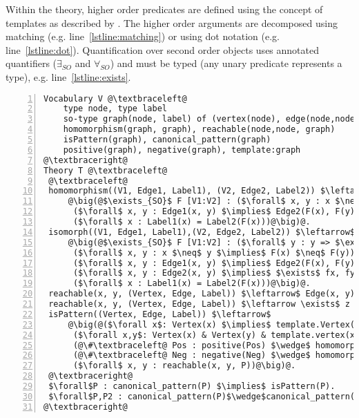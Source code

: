 Within the theory, higher order predicates are defined using the concept of templates as described by \cite{DBLP:journals/tplp/DassevilleHJD15}. %
The higher order arguments are decomposed using matching (e.g. line~\ref{lstline:matching}) or using dot notation (e.g. line~\ref{lstline:dot}).
Quantification over second order objects uses annotated quantifiers ($\exists_{SO}$ and $\forall_{SO}$) and must be typed (any unary predicate represents a type), e.g. line~\ref{lstline:exists}.

\begin{lstlisting}[mathescape,style=model,caption={Faithful encoding for the general graph mining problem},label=lst:faithful, numbers=left]
Vocabulary V @\textbraceleft@
    type node, type label
    so-type graph(node, label) of (vertex(node), edge(node,node), label(node):label)
    homomorphism(graph, graph), reachable(node,node, graph)
    isPattern(graph), canonical_pattern(graph)
    positive(graph), negative(graph), template:graph 
@\textbraceright@ 
Theory T @\textbraceleft@ 
 @\textbraceleft@
 homomorphism((V1, Edge1, Label1), (V2, Edge2, Label2)) $\leftarrow$@\label{lstline:matching}@
     @\big(@$\exists_{SO}$ F [V1:V2] : ($\forall$ x, y : x $\neq$ y $\implies$ F(x) $\neq$ F(y)) $\wedge$@\label{lstline:exists}@
      ($\forall$ x, y : Edge1(x, y) $\implies$ Edge2(F(x), F(y))) $\wedge$
      ($\forall$ x : Label1(x) = Label2(F(x)))@\big)@.
 isomorph((V1, Edge1, Label1),(V2, Edge2, Label2)) $\leftarrow$
     @\big(@$\exists_{SO}$ F [V1:V2] : ($\forall$ y : y => $\exists$ x : F(x)=y) $\land$ 
      ($\forall$ x, y : x $\neq$ y $\implies$ F(x) $\neq$ F(y)) $\wedge$
      ($\forall$ x, y : Edge1(x, y) $\implies$ Edge2(F(x), F(y))) $\wedge$              
      ($\forall$ x, y : Edge2(x, y) $\implies$ $\exists$ fx, fy : Edge1(fx, fy) $\land$ x = F(fx) $\land$ y = F(fy)) $\wedge$
      ($\forall$ x : Label1(x) = Label2(F(x)))@\big)@.
 reachable(x, y, (Vertex, Edge, Label)) $\leftarrow$ Edge(x, y) $\lor$ Edge(y, x).
 reachable(x, y, (Vertex, Edge, Label)) $\leftarrow \exists$ z : reachable(x, z, (Edge, Label)) $\wedge$ reachable(z, y, (Edge, Label)).
 isPattern((Vertex, Edge, Label)) $\leftarrow$
     @\big(@($\forall x$: Vertex(x) $\implies$ template.Vertex(x)) $\land$@\label{lstline:dot}@
      ($\forall x,y$: Vertex(x) & Vertex(y) & template.vertex(x) & template.vertex(y) & template.Edge(x,y) $\implies$ Edge(x,y)) $\land$ 
      (@\#\textbraceleft@ Pos : positive(Pos) $\wedge$ homomorphism(P, Pos) @\textbraceright@ $\geq$ $N_{+}$) $\land$
      (@\#\textbraceleft@ Neg : negative(Neg) $\wedge$ homomorphism(P, Neg) @\textbraceright@ $\leq$ $N_{-}$) $\land$
      ($\forall$ x, y : reachable(x, y, P))@\big)@.
 @\textbraceright@
 $\forall$P : canonical_pattern(P) $\implies$ isPattern(P). 
 $\forall$P,P2 : canonical_pattern(P)$\wedge$canonical_pattern(P2)$\wedge$P$\neq$P2 $\implies$ $\neg$isomorph(P, P2).
@\textbraceright@ 
\end{lstlisting}

